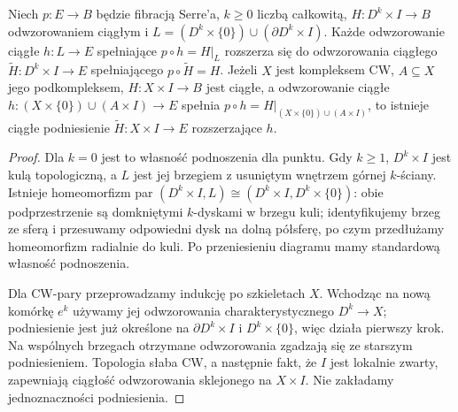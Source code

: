\begin{lemat}
\label{lem:fib-wzgledne-v4}
Niech $p:E\to B$ będzie fibracją Serre'a,
$k\ge0$ liczbą całkowitą, $H:D^k\times I\to B$
odwzorowaniem ciągłym i
$L=(D^k\times\{0\})\cup(\partial D^k\times I)$.
Każde odwzorowanie ciągłe $h:L\to E$ spełniające
$p\circ h=H|_L$ rozszerza się do odwzorowania ciągłego
$\widetilde H:D^k\times I\to E$ spełniającego
$p\circ\widetilde H=H$.
Jeżeli $X$ jest kompleksem CW, $A\subseteq X$ jego podkompleksem,
$H:X\times I\to B$ jest ciągłe, a odwzorowanie ciągłe
$h:(X\times\{0\})\cup(A\times I)\to E$
spełnia $p\circ h=H|_{(X\times\{0\})\cup(A\times I)}$,
to istnieje ciągłe podniesienie $\widetilde H:X\times I\to E$
rozszerzające $h$.
\end{lemat}
\begin{proof}
Dla $k=0$ jest to własność podnoszenia dla punktu. Gdy $k\ge1$,
$D^k\times I$ jest kulą topologiczną, a $L$ jest jej brzegiem
z usuniętym wnętrzem górnej $k$-ściany. Istnieje homeomorfizm par
$(D^k\times I,L)\cong(D^k\times I,D^k\times\{0\})$:
obie podprzestrzenie są domkniętymi $k$-dyskami w brzegu kuli;
identyfikujemy brzeg ze sferą i przesuwamy odpowiedni dysk na dolną
półsferę, po czym przedłużamy homeomorfizm radialnie do kuli.
Po przeniesieniu diagramu mamy standardową własność podnoszenia.

Dla CW-pary przeprowadzamy indukcję po szkieletach $X$.
Wchodząc na nową komórkę $e^k$ używamy jej odwzorowania
charakterystycznego $D^k\to X$; podniesienie jest już określone
na $\partial D^k\times I$ i $D^k\times\{0\}$, więc działa pierwszy
krok. Na wspólnych brzegach otrzymane odwzorowania zgadzają się ze
starszym podniesieniem. Topologia słaba CW, a następnie fakt,
że $I$ jest lokalnie zwarty, zapewniają ciągłość odwzorowania sklejonego
na $X\times I$. Nie zakładamy jednoznaczności podniesienia.
\end{proof}

